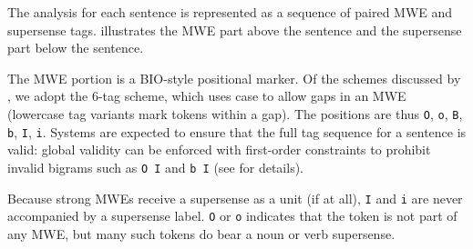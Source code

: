 \documentclass[11pt,letterpaper]{article}
\newcommand{\longversion}[1]{#1} %
\begin{document}


The analysis for each sentence is represented as 
a sequence of paired MWE and supersense tags.  illustrates 
the MWE part above the sentence and the supersense part below the sentence.

The MWE portion is a BIO-style \citep{ramshaw-95} 
positional marker. Of the schemes discussed by \citet{schneider-14}, 
we adopt the 6-tag scheme, which uses case to allow gaps in an MWE (lowercase tag variants mark 
tokens within a gap).
The positions are thus \texttt{O}, \texttt{o}, \texttt{B}, \texttt{b},
\texttt{I}, \texttt{i}.
Systems are expected to ensure that the full tag sequence for a sentence is valid: 
global validity can be enforced with first-order constraints 
to prohibit invalid bigrams such as \texttt{O~I} and \texttt{b~I} (see \citealp{schneider-14} for details).

Because strong MWEs receive a supersense as a unit (if at all), 
\texttt{I} and \texttt{i} are never accompanied by a supersense label.
\texttt{O} or \texttt{o} indicates that the token is not part of any MWE, 
but many such tokens do bear a noun or verb supersense.
\end{document}
